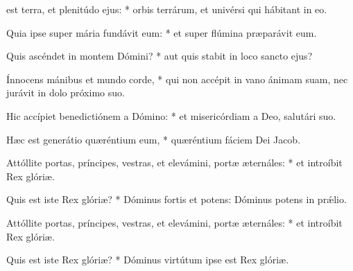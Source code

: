 \begin{psalmus}

     est terra, et plenitúdo ejus: * orbis terrárum, et univérsi qui hábitant in eo.

    Quia ipse super mária fundávit eum: * et super flúmina præparávit eum.

    Quis ascéndet in montem Dómini? * aut quis stabit in loco sancto ejus?

    Ínnocens mánibus et mundo corde, * qui non accépit in vano ánimam suam, nec jurávit in dolo próximo suo.

    Hic accípiet benedictiónem a Dómino: * et misericórdiam a Deo, salutári suo.

    Hæc est generátio quæréntium eum, * quæréntium fáciem Dei Jacob.

    Attóllite portas, príncipes, vestras, et elevámini, portæ æternáles: * et introíbit Rex glóriæ.

    Quis est iste Rex glóriæ? * Dóminus fortis et potens: Dóminus potens in prǽlio.

    Attóllite portas, príncipes, vestras, et elevámini, portæ æternáles: * et introíbit Rex glóriæ.

    Quis est iste Rex glóriæ? * Dóminus virtútum ipse est Rex glóriæ.

\end{psalmus}
